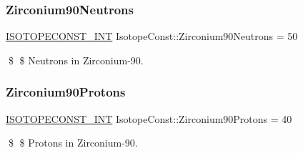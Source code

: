 \subsubsection{\texorpdfstring{Zirconium90\+Neutrons}{Zirconium90Neutrons}}
{\footnotesize\ttfamily \mbox{\hyperlink{group___isotope_const-_macros_ga5f18360b3e99483a35c32d789e62621c}{I\+S\+O\+T\+O\+P\+E\+C\+O\+N\+S\+T\+\_\+\+I\+NT}} Isotope\+Const\+::\+Zirconium90\+Neutrons = 50}

\$ \$ Neutrons in Zirconium-\/90. \mbox{\label{group___isotope_const-_zirconium-_zr90_ga277918ed93796181c6dfb042545a3b05}} 
\subsubsection{\texorpdfstring{Zirconium90\+Protons}{Zirconium90Protons}}
{\footnotesize\ttfamily \mbox{\hyperlink{group___isotope_const-_macros_ga5f18360b3e99483a35c32d789e62621c}{I\+S\+O\+T\+O\+P\+E\+C\+O\+N\+S\+T\+\_\+\+I\+NT}} Isotope\+Const\+::\+Zirconium90\+Protons = 40}

\$ \$ Protons in Zirconium-\/90. 